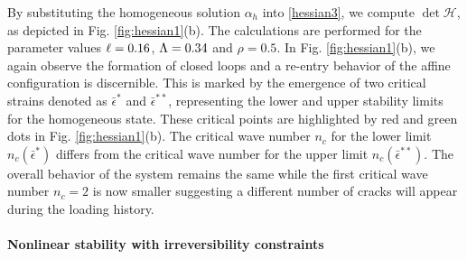 By substituting the homogeneous solution {$\alpha_h$} into \eqref{hessian3}, we compute $\det \mathcal{H}$, as depicted  in Fig. \ref{fig:hessian1}(b). The calculations are performed for the parameter values $\ell=0.16$, $\Lambda=0.34$ and $\rho=0.5$.  In Fig. \ref{fig:hessian1}(b), we again observe the formation of closed loops and a re-entry behavior of the affine configuration is discernible. This is marked by the emergence of two critical strains denoted as $\bar\epsilon^*$ and $\bar\epsilon^{**}$, representing the lower and upper stability limits for the homogeneous state. These critical points are highlighted by red and green dots in Fig. \ref{fig:hessian1}(b). The critical wave number $n_c$ for the lower limit $n_c(\bar{\epsilon}^*)$    differs from the critical wave number for the upper limit $n_c(\bar{\epsilon}^{**})$. The overall behavior of the system remains the same while the first critical wave number $n_c=2$ is now smaller suggesting a different number of cracks will appear during the loading history.




% 

\paragraph{Nonlinear stability with irreversibility constraints}

